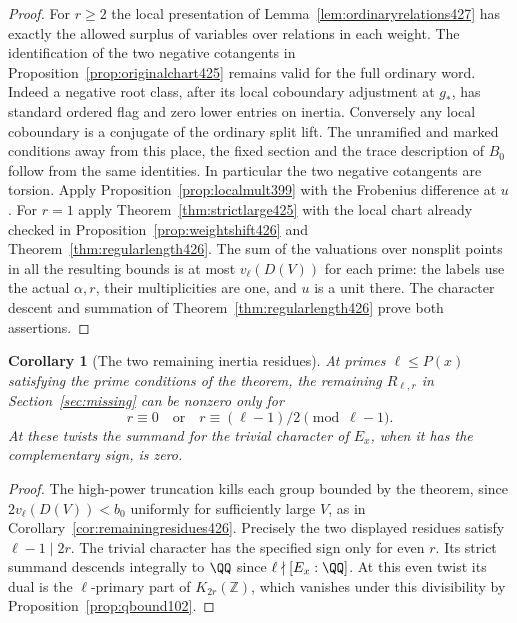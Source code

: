 \documentclass[a4paper,11pt]{article}
\newtheorem{corollary}[proposition]{Corollary}
\theoremstyle{definition}
\theoremstyle{remark}
\newcommand{\ZZ}{\mathbb Z}\newcommand{\ord}{\operatorname{ord}}
\numberwithin{equation}{section}
\begin{document}
\begin{proof}
For \(r\ge2\) the local presentation of
Lemma~\ref{lem:ordinaryrelations427} has exactly the allowed
surplus of variables over relations in each weight. The
identification of the two negative cotangents in
Proposition~\ref{prop:originalchart425} remains valid for the
full ordinary word. Indeed a negative root class, after its
local coboundary adjustment at \(g_*\), has standard ordered
flag and zero lower entries on inertia. Conversely any local
coboundary is a conjugate of the ordinary split lift. The
unramified and marked conditions away from this place, the
fixed section and the trace description of \(B_0\) follow from
the same identities. In particular the two negative cotangents
are torsion. Apply Proposition~\ref{prop:localmult399} with
the Frobenius difference at \(u\). For \(r=1\) apply
Theorem~\ref{thm:strictlarge425} with the local chart already
checked in Proposition~\ref{prop:weightshift426} and
Theorem~\ref{thm:regularlength426}. The sum of the valuations
over nonsplit points in all the resulting bounds is at most
\(v_\ell(D(V))\) for each prime: the labels use the actual
\(\alpha,r\), their multiplicities are one, and \(u\) is a
unit there. The character descent and summation of
Theorem~\ref{thm:regularlength426} prove both assertions.
\end{proof}

\begin{corollary}[The two remaining inertia residues]\leavevmode
\label{cor:smallorder427}
At primes \(\ell\le P(x)\) satisfying the prime conditions
of the theorem, the remaining \(R_{\ell,r}\) in
Section~\ref{sec:missing} can be nonzero only for
\[
                 r\equiv 0\quad\text{or}\quad
                 r\equiv(\ell-1)/2\pmod{\ell-1}.
\]
At these twists the summand for the trivial character of
\(E_x\), when it has the complementary sign, is zero.
\end{corollary}
\begin{proof}
The high-power truncation kills each group bounded by the
theorem, since \(2v_\ell(D(V))<b_0\) uniformly for sufficiently
large \(V\), as in Corollary~\ref{cor:remainingresidues426}.
Precisely the two displayed residues satisfy \(\ell-1\mid2r\).
The trivial character has the specified sign only for even
\(r\). Its strict summand descends integrally to \(\QQ\)
since \(\ell\nmid[E_x:\QQ]\). At this even twist its dual is
the \(\ell\)-primary part of \(K_{2r}(\ZZ)\), which vanishes
under this divisibility by Proposition~\ref{prop:qbound102}.
\end{proof}
\end{document}

